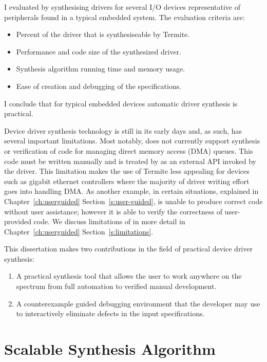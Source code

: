 I evaluated \termite by synthesising drivers for several I/O devices representative of peripherals found in a typical embedded system. The evaluation criteria are:
\begin{itemize}
    \item Percent of the driver that is synthesiseable by Termite.
    \item Performance and code size of the synthesized driver.
    \item Synthesis algorithm running time and memory usage.
    \item Ease of creation and debugging of the specifications.
\end{itemize}
I conclude that for typical embedded devices automatic driver synthesis is practical. 

Device driver synthesis technology is still in its early days and, as such, has several important limitations.  Most notably, \termite does not currently support synthesis or verification of code for managing direct memory access (DMA) queues.  This code must be written manually and is treated by \termite as an external API invoked by the driver. This limitation makes the use of Termite less appealing for devices such as gigabit ethernet controllers where the majority of driver writing effort goes into handling DMA. As another example, in certain situations, explained in Chapter~\ref{ch:userguided} Section~\ref{s:user-guided}, \termite is unable to produce correct code without user assistance; however it is able to verify the correctness of user-provided code.  We discuss limitations of \termite in more detail in Chapter~\ref{ch:userguided} Section~\ref{s:limitations}.

This dissertation makes two contributions in the field of practical device driver synthesis:
\begin{enumerate}
    \item A practical synthesis tool that allows the user to work anywhere on the spectrum from full automation to verified manual development.
    \item A counterexample guided debugging environment that the developer may use to interactively eliminate defects in the input specifications.
\end{enumerate}

\section{Scalable Synthesis Algorithm}
\label{sec:scalable_synth}

